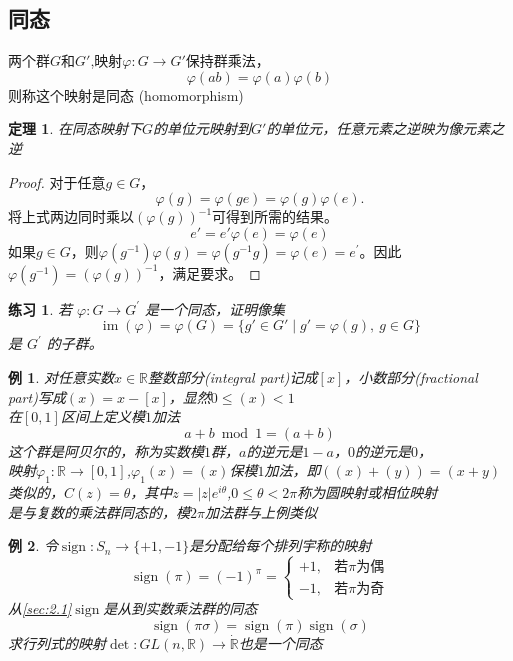 \documentclass[hyperref,UTF8]{ctexbook}
\newtheorem{eg}{例}[chapter]
\newtheorem{theorem}{定理}[chapter]
\newtheorem*{exercise}{练习}
\begin{document}
\subsection{同态}
两个群$G$和$G'$,映射$\varphi : G \rightarrow G'$保持群乘法，$$
\varphi(a b)=\varphi(a) \varphi(b)
$$
则称这个映射是同态 (homomorphism)
\begin{theorem}
    在同态映射下$G$的单位元映射到$G'$的单位元，任意元素之逆映为像元素之逆
\end{theorem}
\begin{proof}
    对于任意$g\in G$，
    $$
    \varphi(g)=\varphi(ge)=\varphi(g)\varphi(e).
    $$
    将上式两边同时乘以$(\varphi(g))^{-1}$可得到所需的结果。
    $$e'=e'\varphi(e)=\varphi(e)$$
    如果$g\in G$，则$\varphi(g^{-1})\varphi(g)=\varphi(g^{-1}g)=\varphi(e)=e^{\prime}$。因此$\varphi(g^{-1})=(\varphi(g))^{-1}$，满足要求。
     
\end{proof}
\begin{exercise}
    若 $\varphi: G\to G^{\prime}$ 是一个同态，证明像集
\begin{equation}\label{eq:2.13}
    \operatorname{im}(\varphi)=\varphi(G)=\{g'\in G'\mid g'=\varphi(g),\:g\in G\}        
\end{equation}
    是 $G^{\prime}$ 的子群。
\end{exercise}
\begin{eg}
    对任意实数$x\in \mathbb{R}$整数部分(integral part)记成$[x]$，小数部分(fractional part)写成$(x)=x-[x]$，显然$0 \leqslant(x)<1$\\
    在$[0,1]$区间上定义模\(1\)加法$$
    a+b \bmod 1=(a+b)
    $$
    这个群是阿贝尔的，称为实数模\(1\)群，\(a\)的逆元是\(1-a\)，\(0\)的逆元是\(0\)，\\
    映射$\varphi_{1}: \mathbb{R} \rightarrow [0,1]$,$\varphi_{1}(x)=(x)$保模\(1\)加法，即$((x)+(y))=(x+y)$\\
    类似的，$C(z)=\theta$，其中$z=|z| e^{i \theta}$,$0 \leqslant \theta<2 \pi$称为圆映射或相位映射\\
    是与复数的乘法群同态的，模$2\pi$加法群与上例类似
\end{eg}
\begin{eg}
    令$\operatorname{sign}:  S_{n} \rightarrow\{+1,-1\}$是分配给每个排列宇称的映射
    $$\operatorname{sign}(\pi)=(-1)^{\pi}=\begin{cases}
+1, & \text {若\(\pi\)为偶} \\
-1, & \text {若\(\pi\)为奇}
\end{cases}
$$
从\ref{sec:2.1}$\operatorname{sign}$是从到实数乘法群的同态$$
\operatorname{sign}(\pi \sigma)=\operatorname{sign}(\pi) \operatorname{sign}(\sigma)
$$
求行列式的映射$
\operatorname{det}: G L(n, \mathbb{R}) \rightarrow \dot{\mathbb{R}}
$也是一个同态
\end{eg}
\end{document}
